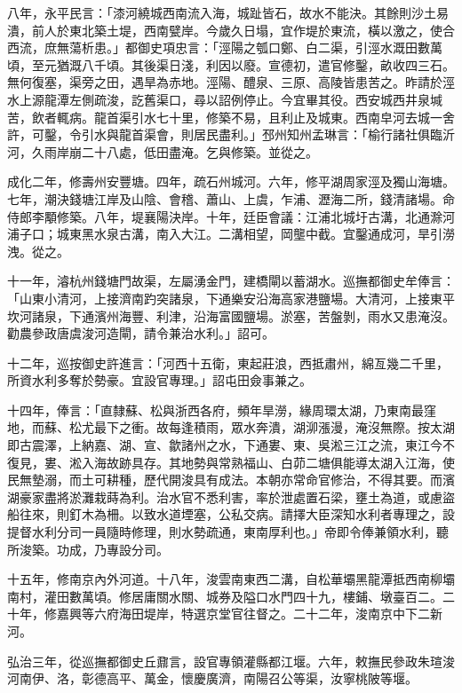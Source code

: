 八年，永平民言：「漆河繞城西南流入海，城趾皆石，故水不能決。其餘則沙土易潰，前人於東北築土堤，西南甓岸。今歲久日塌，宜作堤於東流，橫以激之，使合西流，庶無蕩析患。」都御史項忠言：「涇陽之瓠口鄭、白二渠，引涇水溉田數萬頃，至元猶溉八千頃。其後渠日淺，利因以廢。宣德初，遣官修鑿，畝收四三石。無何復塞，渠旁之田，遇旱為赤地。涇陽、醴泉、三原、高陵皆患苦之。昨請於涇水上源龍潭左側疏浚，訖舊渠口，尋以詔例停止。今宜畢其役。西安城西井泉堿苦，飲者輒病。龍首渠引水七十里，修築不易，且利止及城東。西南皁河去城一舍許，可鑿，令引水與龍首渠會，則居民盡利。」邳州知州孟琳言：「榆行諸社俱臨沂河，久雨岸崩二十八處，低田盡淹。乞與修築。並從之。

成化二年，修壽州安豐塘。四年，疏石州城河。六年，修平湖周家涇及獨山海塘。七年，潮決錢塘江岸及山陰、會稽、蕭山、上虞，乍浦、瀝海二所，錢清諸場。命侍郎李顒修築。八年，堤襄陽決岸。十年，廷臣會議：江浦北城圩古溝，北通滁河浦子口；城東黑水泉古溝，南入大江。二溝相望，岡壟中截。宜鑿通成河，旱引澇洩。從之。

十一年，濬杭州錢塘門故渠，左屬湧金門，建橋閘以蓄湖水。巡撫都御史牟俸言：「山東小清河，上接濟南趵突諸泉，下通樂安沿海高家港鹽場。大清河，上接東平坎河諸泉，下通濱州海豐、利津，沿海富國鹽場。淤塞，苦盤剝，雨水又患淹沒。勸農參政唐虞浚河造閘，請令兼治水利。」詔可。

十二年，巡按御史許進言：「河西十五衛，東起莊浪，西抵肅州，綿亙幾二千里，所資水利多奪於勢豪。宜設官專理。」詔屯田僉事兼之。

十四年，俸言：「直隸蘇、松與浙西各府，頻年旱澇，緣周環太湖，乃東南最窪地，而蘇、松尤最下之衝。故每逢積雨，眾水奔潰，湖泖漲漫，淹沒無際。按太湖即古震澤，上納嘉、湖、宣、歙諸州之水，下通婁、東、吳淞三江之流，東江今不復見，婁、淞入海故跡具存。其地勢與常熟福山、白茆二塘俱能導太湖入江海，使民無墊溺，而土可耕種，歷代開浚具有成法。本朝亦常命官修治，不得其要。而濱湖豪家盡將淤灘栽蒔為利。治水官不悉利害，率於泄處置石梁，壅土為道，或慮盜船往來，則釘木為柵。以致水道堙塞，公私交病。請擇大臣深知水利者專理之，設提督水利分司一員隨時修理，則水勢疏通，東南厚利也。」帝即令俸兼領水利，聽所浚築。功成，乃專設分司。

十五年，修南京內外河道。十八年，浚雲南東西二溝，自松華壩黑龍潭抵西南柳壩南村，灌田數萬頃。修居庸關水關、城券及隘口水門四十九，樓鋪、墩臺百二。二十年，修嘉興等六府海田堤岸，特選京堂官往督之。二十二年，浚南京中下二新河。

弘治三年，從巡撫都御史丘鼐言，設官專領灌縣都江堰。六年，敕撫民參政朱瑄浚河南伊、洛，彰德高平、萬金，懷慶廣濟，南陽召公等渠，汝寧桃陂等堰。

